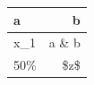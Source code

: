 
\begin{tabular}{lr}
\toprule
a & b\\
\midrule
x\_1 & a \& b\\
50\% & \$z\$\\
\bottomrule
\end{tabular}
